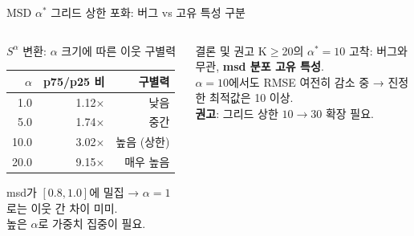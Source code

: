 \documentclass[aspectratio=169,10pt]{beamer}
\begin{document}
\begin{frame}[shrink=10]{MSD $\alpha^*$ 그리드 상한 포화: 버그 vs 고유 특성 구분}
\begin{columns}[T]
			\begin{block}{$S^\alpha$ 변환: $\alpha$ 크기에 따른 이웃 구별력}
				\small
				\begin{tabular}{r|r|r}
					\toprule
					$\alpha$ & p75/p25 비 & 구별력 \\
					\midrule
					1.0  & 1.12$\times$ & 낮음 \\
					5.0  & 1.74$\times$ & 중간 \\
					10.0 & 3.02$\times$ & 높음 (상한) \\
					20.0 & 9.15$\times$ & 매우 높음 \\
					\bottomrule
				\end{tabular}
				\vspace{0.2em}
				\small msd가 $[0.8, 1.0]$에 밀집 → $\alpha=1$로는 이웃 간 차이 미미.\\높은 $\alpha$로 가중치 집중이 필요.
			\end{block}
			\begin{exampleblock}{결론 및 권고}
				\small
				K$\geq$20의 $\alpha^*=10$ 고착: 버그와 무관, \textbf{msd 분포 고유 특성}.\\
				$\alpha=10$에서도 RMSE 여전히 감소 중 → 진정한 최적값은 10 이상.\\
				\textbf{권고}: 그리드 상한 $10 \to 30$ 확장 필요.
			\end{exampleblock}
	\end{columns}
\end{frame}
\end{document}

